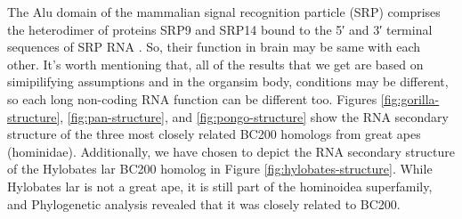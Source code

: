 \documentclass[conference, 11pt]{IEEEtran}
\begin{document}
The Alu domain of the mammalian signal recognition particle (SRP) comprises the heterodimer of proteins SRP9 and SRP14 bound to the 5′ and 3′ terminal sequences of SRP RNA \cite{weichenrieder2000structure}. 
So, their function in brain may be same with each other. It's worth mentioning that, all of the results that we get are based on simipilifying assumptions and in the organsim body, conditions may be different, so each long non-coding RNA function can be different too.
Figures \ref{fig:gorilla-structure}, \ref{fig:pan-structure}, and \ref{fig:pongo-structure} show the RNA secondary structure of the three most closely related BC200 homologs from great apes (hominidae). 
Additionally, we have chosen to depict the RNA secondary structure of the Hylobates lar BC200 homolog in Figure \ref{fig:hylobates-structure}. 
While Hylobates lar is not a great ape, it is still part of the hominoidea superfamily, and Phylogenetic analysis revealed that it was closely related to BC200.
\end{document}
